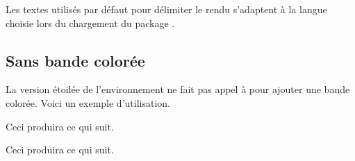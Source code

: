 \begin{bdocinfo}
    Les textes utilisés par défaut  pour délimiter le rendu s'adaptent à la langue choisie lors du chargement du package .
\end{bdocinfo}




\subsection{Sans bande colorée}

\begin{bdocexa}
	La version étoilée de l'environnement  ne fait pas appel à  pour ajouter une bande colorée.
	Voici un exemple d'utilisation.


	Ceci produira ce qui suit.

	\medskip
	
	
\end{bdocexa}




\begin{bdocexa}
	\leavevmode


	Ceci produira ce qui suit.

	\medskip
	
	
\end{bdocexa}




%
%    
%    
%    
%    
%    
%    
%    
%    
%    	
%    
%    
%    
%    
%
%
%
%



